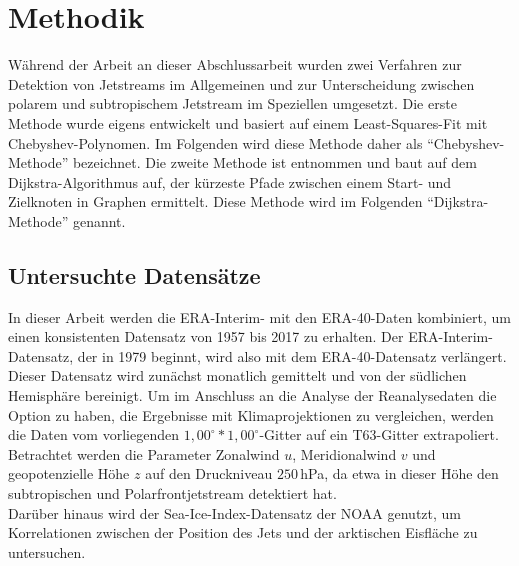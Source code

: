 
\chapter{Methodik}
Während der Arbeit an dieser Abschlussarbeit wurden zwei Verfahren zur Detektion von Jetstreams im Allgemeinen und zur Unterscheidung zwischen polarem und subtropischem Jetstream im Speziellen umgesetzt. Die erste Methode wurde eigens entwickelt und basiert auf einem Least-Squares-Fit mit Chebyshev-Polynomen. Im Folgenden wird diese Methode daher als \enquote{Chebyshev-Methode} bezeichnet. Die zweite Methode ist \citet{molnos-2017} entnommen und baut auf dem Dijkstra-Algorithmus auf, der kürzeste Pfade zwischen einem Start- und Zielknoten in Graphen ermittelt. Diese Methode wird im Folgenden \enquote{Dijkstra-Methode} genannt. 

\section{Untersuchte Datensätze}
In dieser Arbeit werden die ERA-Interim- \citep{dee-2011} mit den ERA-40-Daten \citep{uppala-2005} kombiniert, um einen konsistenten Datensatz von 1957 bis 2017 zu erhalten. Der ERA-Interim-Datensatz, der in 1979 beginnt, wird also mit dem ERA-40-Datensatz verlängert. Dieser Datensatz wird zunächst monatlich gemittelt und von der südlichen Hemisphäre bereinigt. Um im Anschluss an die Analyse der Reanalysedaten die Option zu haben, die Ergebnisse mit Klimaprojektionen zu vergleichen, werden die Daten vom vorliegenden $1,00^{\circ} \ast 1,00^{\circ}$-Gitter auf ein T63-Gitter extrapoliert.
\\
Betrachtet werden die Parameter Zonalwind $u$, Meridionalwind $v$ und geopotenzielle Höhe $z$ auf den Druckniveau $250\,$hPa, da \citet{rikus-2015} etwa in dieser Höhe den subtropischen und Polarfrontjetstream detektiert hat.
\\
Darüber hinaus wird der Sea-Ice-Index-Datensatz der NOAA \citep{sii-2016} genutzt, um Korrelationen zwischen der Position des Jets und der arktischen Eisfläche zu untersuchen.


